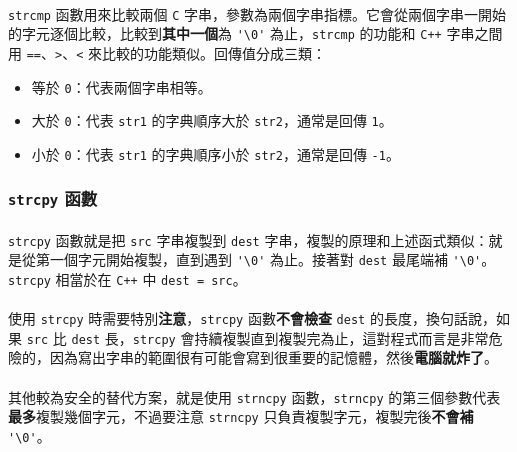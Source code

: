 \documentclass[12pt,a4paper,oneside]{report}
\begin{document}
\begin{CJK}{UTF8}{bkai}
\paragraph{}\lstinline!strcmp! 函數用來比較兩個 \texttt{C} 字串，參數為兩個字串指標。它會從兩個字串一開始的字元逐個比較，比較到\textbf{其中一個}為 \lstinline!'\0'! 為止，\lstinline!strcmp! 的功能和 \texttt{C++} 字串之間用 \lstinline!==!、\lstinline!>!、\lstinline!<! 來比較的功能類似。回傳值分成三類：

\begin{itemize}
\item 等於 \lstinline!0!：代表兩個字串相等。
\item 大於 \lstinline!0!：代表 \lstinline!str1! 的字典順序大於 \lstinline!str2!，通常是回傳 \lstinline!1!。
\item 小於 \lstinline!0!：代表 \lstinline!str1! 的字典順序小於 \lstinline!str2!，通常是回傳 \lstinline!-1!。
\end{itemize}

\subsubsection{\lstinline!strcpy! 函數}

\paragraph{}\lstinline!strcpy! 函數就是把 \lstinline!src! 字串複製到 \lstinline!dest! 字串，複製的原理和上述函式類似：就是從第一個字元開始複製，直到遇到 \lstinline!'\0'! 為止。接著對 \lstinline!dest! 最尾端補 \lstinline!'\0'!。\lstinline!strcpy! 相當於在 \texttt{C++} 中 \lstinline!dest = src!。
\paragraph{}使用 \lstinline!strcpy! 時需要特別{\color{blue}\textbf{注意}}，\lstinline!strcpy! 函數{\color{red}\textbf{不會檢查}} \lstinline!dest! 的長度，換句話說，如果 \lstinline!src! 比 \lstinline!dest! 長，\lstinline!strcpy! 會持續複製直到複製完為止，這對程式而言是非常危險的，因為寫出字串的範圍很有可能會寫到很重要的記憶體，然後{\color{red}\textbf{電腦就炸了}}。
\paragraph{}其他較為安全的替代方案，就是使用 \lstinline!strncpy! 函數，\lstinline!strncpy! 的第三個參數代表\textbf{最多}複製幾個字元，不過要注意 \lstinline!strncpy! 只負責複製字元，複製完後{\color{blue}\textbf{不會補}} \lstinline!'\0'!。


\end{CJK}
\end{document}
